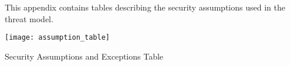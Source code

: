 

This appendix contains tables describing the security assumptions used in the
threat model.

\begin{table*}[h]
    \texttt{[image: assumption\_table]}
    \caption{Security Assumptions and Exceptions Table}
    \label{tab:sec_assumpt}
\end{table*}

\vfill